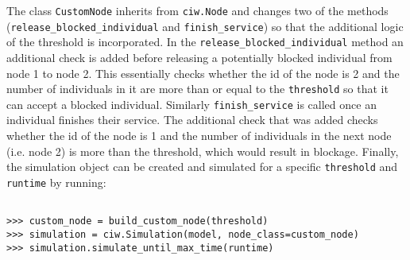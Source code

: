 The class \lstinline[style=pystyle]{CustomNode} inherits from
\lstinline[style=pystyle]{ciw.Node} and changes two of the methods
(\lstinline[style=pystyle]{release_blocked_individual} and
\lstinline[style=pystyle]{finish_service}) so that the additional logic of the
threshold is incorporated.
In the \lstinline[style=pystyle]{release_blocked_individual} method an
additional check is added before releasing a potentially blocked individual from
node 1 to node 2.
This essentially checks whether the id of the node is 2 and
the number of individuals in it are more than or equal to the
\lstinline[style=pystyle]{threshold} so that it can accept a blocked individual.
Similarly \lstinline[style=pystyle]{finish_service} is called once an individual
finishes their service.
The additional check that was added checks whether the id of the node is 1 and
the number of individuals in the next node (i.e. node 2) is more than the
threshold, which would result in blockage.
Finally, the simulation object can be created and simulated for a specific
\lstinline[style=pystyle]{threshold} and \lstinline[style=pystyle]{runtime} by
running:

\begin{lstlisting}[style=pystyle]

>>> custom_node = build_custom_node(threshold)
>>> simulation = ciw.Simulation(model, node_class=custom_node)
>>> simulation.simulate_until_max_time(runtime)

\end{lstlisting}


